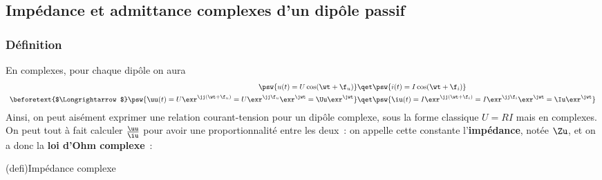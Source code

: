 \documentclass[../../main/main.tex]{subfiles}
\begin{document}

\subsection{Impédance et admittance complexes d'un dipôle passif}
\subsubsection{Définition}
En complexes, pour chaque dipôle on aura
\begin{align*}
	\psw{%
		u(t) = U\cos(\wt+\f_u)
	}%
	 & \qet
	\psw{%
		i(t) = I\cos(\wt+\f_i)
	}%
	\\
	\beforetext{$\Longrightarrow$}
	\psw{%
		\uu(t) = U\exr^{\jj(\wt+\f_u)} = U\exr^{\jj\f_u}\exr^{\jwt} =
		\Uu\exr^{\jwt}
	}%
	 & \qet
	\psw{%
		\iu(t) = I\exr^{\jj(\wt+\f_i)} = I\exr^{\jj\f_i}\exr^{\jwt} =
		\Iu\exr^{\jwt}
	}%
\end{align*}
Ainsi, on peut aisément exprimer une relation courant-tension pour un dipôle
complexe, sous la forme classique $U = RI$ mais en complexes. On peut
tout à fait calculer $\frac{\uu}{\iu}$ pour avoir une proportionnalité
entre les deux~: on appelle cette constante l'\textbf{impédance}, notée
$\Zu$, et on a donc la \textbf{loi d'Ohm complexe}~:

\begin{tcb*}[sidebyside](defi){Impédance complexe}
	\tcblower
	\begin{center}
	\end{center}
\end{tcb*}
\end{document}
